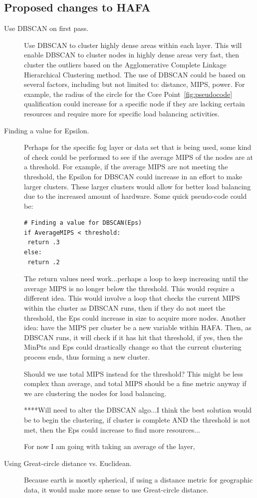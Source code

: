 \documentclass[letterpaper,twocolumn,10pt]{article}
\begin{document}
\subsection{Proposed changes to HAFA}
\begin{description}
\item[Use DBSCAN on first pass.] Use DBSCAN to cluster highly dense areas within each layer. This will enable DBSCAN to cluster nodes in highly dense areas very fast, then cluster the outliers based on the Agglomerative Complete Linkage Hierarchical Clustering method. The use of DBSCAN could be based on several factors, including but not limited to: distance, MIPS, power. For example, the radius of the circle for the Core Point~\ref{fig:pseudocode} qualification could increase for a specific node if they are lacking certain resources and require more for specific load balancing activities.

\item[Finding a value for Epsilon.] Perhaps for the specific fog layer or data set that is being used, some kind of check could be performed to see if the average MIPS of the nodes are at a threshold. For example, if the average MIPS are not meeting the threshold, the Epsilon for DBSCAN could increase in an effort to make larger clusters. These larger clusters would allow for better load balancing due to the increased amount of hardware. Some quick pseudo-code could be:
\begin{verbatim}
# Finding a value for DBSCAN(Eps)
if AverageMIPS < threshold:
 return .3
else:
 return .2
\end{verbatim}
 The return values need work...perhaps a loop to keep increasing until the average MIPS is no longer below the threshold. This would require a different idea. This would involve a loop that checks the current MIPS within the cluster as DBSCAN runs, then if they do not meet the threshold, the Eps could increase in size to acquire more nodes. Another idea: have the MIPS per cluster be a new variable within HAFA. Then, as DBSCAN runs, it will check if it has hit that threshold, if yes, then the MinPts and Eps could drastically change so that the current clustering process ends, thus forming a new cluster.
 
 Should we use total MIPS instead for the threshold? This might be less complex than average, and total MIPS should be a fine metric anyway if we are clustering the nodes for load balancing.
 
 ****Will need to alter the DBSCAN algo...I think the best solution would be to begin the clustering, if cluster is complete AND the threshold is not met, then the Eps could increase to find more resources...
 
For now I am going with taking an average of the layer, 
 
 \item[Using Great-circle distance vs. Euclidean.] Because earth is mostly spherical, if using a distance metric for geographic data, it would make more sense to use Great-circle distance.
\end{description}
\end{document}
